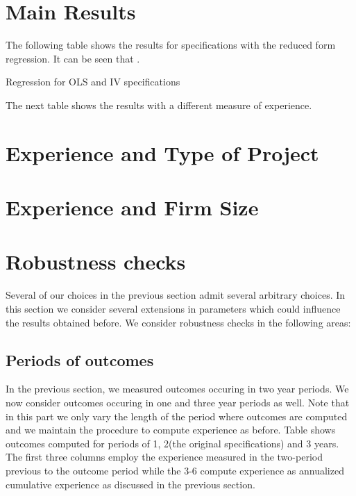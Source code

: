 \section{Main Results}

The following table shows the results for specifications with the reduced form regression. It can be seen that .

\begin{table}[!htbp] \centering
  \caption{Regression for OLS and IV specifications}
  \label{}
  \resizebox{\textwidth}{!}{
}

\end{table}

The next table shows the results with a different measure of experience.

\section{Experience and Type of Project}

\section{Experience and Firm Size}

\section{Robustness checks}
Several of our choices in the previous section admit several arbitrary choices. In this section we consider several extensions in parameters which could influence the results obtained before. We consider robustness checks in the following areas:
\subsection{Periods of outcomes}
In the previous section, we measured outcomes occuring in two year periods. We now consider outcomes occuring in one and three year periods as well. Note that in this part we only vary the length of the period where outcomes are computed and we maintain the procedure to compute experience as before. Table shows outcomes computed for periods of 1, 2(the original specifications) and 3 years. The first three columns employ the experience measured in the two-period previous to the outcome period while the 3-6 compute experience as annualized cumulative experience as discussed in the previous section.

